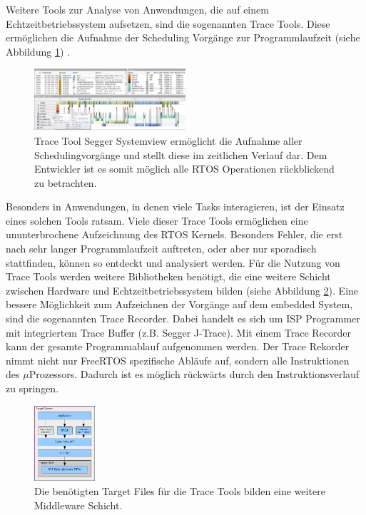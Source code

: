 Weitere Tools zur Analyse von Anwendungen, die auf einem Echtzeitbetriebssystem aufsetzen, sind die sogenannten Trace Tools. Diese ermöglichen die Aufnahme der Scheduling Vorgänge zur Programmlaufzeit (siehe Abbildung \ref {fig:Systemview}) . 
\begin{figure}[hbt]
	\centering
		\includegraphics[width=0.5\textwidth]{Pictures/Segger/systemview.png}
	\caption{Trace Tool Segger Systemview ermöglicht die Aufnahme aller Schedulingvorgänge und stellt diese im zeitlichen Verlauf dar. Dem Entwickler ist es somit möglich alle RTOS Operationen rückblickend zu betrachten.}
	\label{fig:Systemview}
\end{figure}
Besonders in Anwendungen, in denen viele Tasks interagieren, ist der Einsatz eines solchen Tools ratsam. Viele dieser Trace Tools ermöglichen eine ununterbrochene Aufzeichnung des RTOS Kernels. Besonders Fehler, die erst nach sehr langer Programmlaufzeit auftreten, oder aber nur sporadisch stattfinden, können so entdeckt und analysiert werden. Für die Nutzung von Trace Tools werden weitere Bibliotheken benötigt, die eine weitere Schicht zwischen Hardware und Echtzeitbetriebssystem bilden (siehe Abbildung \ref{fig:SystemviewTarget}). Eine bessere Möglichkeit zum Aufzeichnen der Vorgänge auf dem embedded System, sind die sogenannten Trace Recorder. Dabei handelt es sich um ISP Programmer mit integriertem Trace Buffer (z.B. Segger J-Trace). Mit einem Trace Recorder kann der gesamte Programmablauf aufgenommen werden. Der Trace Rekorder nimmt nicht nur FreeRTOS spezifische Abläufe auf, sondern alle Instruktionen des $\mu$Prozessors. Dadurch ist es möglich rückwärts durch den Instruktionsverlauf zu springen.
\begin{figure}[hbt]
	\centering
		\includegraphics[width=0.2\textwidth]{Pictures/Segger/SystemViewTarget.png}
	\caption{Die benötigten Target Files für die Trace Tools bilden eine weitere Middleware Schicht.}
	\label{fig:SystemviewTarget}
\end{figure}
